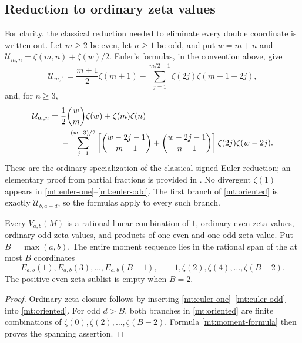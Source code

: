 \subsection{Reduction to ordinary zeta values}

For clarity, the classical reduction needed to eliminate every double
coordinate is written out. Let $m\ge2$ be even, let $n\ge1$ be odd,
and put $w=m+n$ and
$\mathcal U_{m,n}=\zeta(m,n)+\zeta(w)/2$. Euler's formulas, in the
convention above, give
\begin{equation}\label{mt:euler-one}
 \mathcal U_{m,1}=\frac{m+1}{2}\zeta(m+1)
  -\sum_{j=1}^{m/2-1}\zeta(2j)\zeta(m+1-2j),
\end{equation}
and, for $n\ge3$,
\begin{align}
 \mathcal U_{m,n}={}&\frac12\binom wm\zeta(w)+\zeta(m)\zeta(n)
 \notag\\
 &-\sum_{j=1}^{(w-3)/2}
  \left[\binom{w-2j-1}{m-1}+\binom{w-2j-1}{n-1}\right]
                      \zeta(2j)\zeta(w-2j).
 \label{mt:euler-odd}
\end{align}
These are the ordinary specialization of the classical signed Euler
reduction; an elementary proof from partial fractions is provided in
\cite[Eq.~(2)--(3) and Proposition~1]{Bradley2007}. No divergent
$\zeta(1)$ appears in \eqref{mt:euler-one}--\eqref{mt:euler-odd}.
The first branch of \eqref{mt:oriented} is exactly
$\mathcal U_{b,a-d}$, so the formulas apply to every such branch.

\begin{corollary}
\label{mt:closure}
Every $V_{a,b}(M)$ is a rational linear combination of $1$, ordinary
even zeta values, ordinary odd zeta values, and products of one even
and one odd zeta value. Put $B=\max(a,b)$. The entire moment sequence
lies in the rational span of the at most $B$ coordinates
\begin{equation}\label{mt:finite-span}
 E_{a,b}(1),E_{a,b}(3),\ldots,E_{a,b}(B-1),
 \qquad 1,\zeta(2),\zeta(4),\ldots,\zeta(B-2).
\end{equation}
The positive even-zeta sublist is empty when $B=2$.
\end{corollary}
\begin{proof}
Ordinary-zeta closure follows by inserting
\eqref{mt:euler-one}--\eqref{mt:euler-odd} into
\eqref{mt:oriented}. For odd $d>B$, both branches in
\eqref{mt:oriented} are finite combinations of
$\zeta(0),\zeta(2),\ldots,\zeta(B-2)$. Formula
\eqref{mt:moment-formula} then proves the spanning assertion.
\end{proof}

